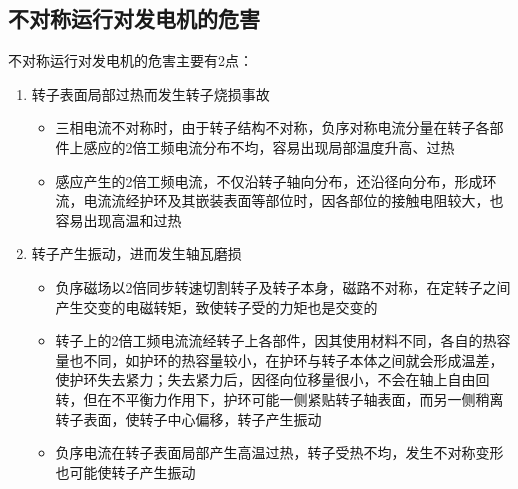 \documentclass[blue]{elegantnote}
\begin{document}
\subsection{不对称运行对发电机的危害}
\indent	不对称运行对发电机的危害主要有2点：
	\begin{enumerate}
		\item 转子表面局部过热而发生转子烧损事故
			\begin{itemize}
				\item 三相电流不对称时，由于转子结构不对称，负序对称电流分量在转子各部件上感应的2倍工频电流分布不均，容易出现局部温度升高、过热
				\item 感应产生的2倍工频电流，不仅沿转子轴向分布，还沿径向分布，形成环流，电流流经护环及其嵌装表面等部位时，因各部位的接触电阻较大，也容易出现高温和过热
			\end{itemize}
		\item 转子产生振动，进而发生轴瓦磨损
			\begin{itemize}
				\item 负序磁场以2倍同步转速切割转子及转子本身，磁路不对称，在定转子之间产生交变的电磁转矩，致使转子受的力矩也是交变的
				\item 转子上的2倍工频电流流经转子上各部件，因其使用材料不同，各自的热容量也不同，如护环的热容量较小，在护环与转子本体之间就会形成温差，使护环失去紧力；失去紧力后，因径向位移量很小，不会在轴上自由回转，但在不平衡力作用下，护环可能一侧紧贴转子轴表面，而另一侧稍离转子表面，使转子中心偏移，转子产生振动
				\item 负序电流在转子表面局部产生高温过热，转子受热不均，发生不对称变形也可能使转子产生振动
			\end{itemize}
	\end{enumerate}
\end{document}
